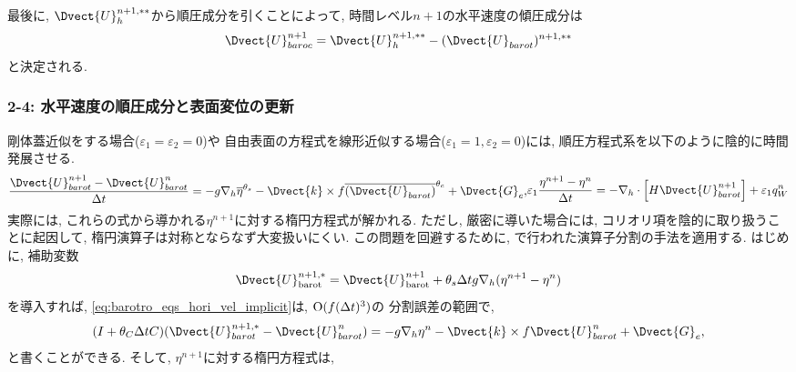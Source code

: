 最後に, $\Dvect{U}_h^{n+1,**}$から順圧成分を引くことによって, 
時間レベル$n+1$の水平速度の傾圧成分は
\begin{align*}
 \Dvect{U}_{baroc}^{n+1} 
 = \Dvect{U}_h^{n+1,**} - (\Dvect{U}_{barot})^{n+1,**}
\end{align*}
と決定される. 

\subsubsection*{2-4: 水平速度の順圧成分と表面変位の更新}
\vspace{-0.5cm}
剛体蓋近似をする場合($\varepsilon_1=\varepsilon_2=0$)や
自由表面の方程式を線形近似する場合($\varepsilon_1=1, \varepsilon_2=0$)には, 
順圧方程式系を以下のように陰的に時間発展させる. 
\begin{subequations}
\begin{align}
  \dfrac{\Dvect{U}^{n+1}_{barot} - \Dvect{U}^n_{barot}}{\Delta t}
 = 
 - g \nabla_h \overline{\eta}^{\theta_s}
 - \Dvect{k}\times f \overline{(\Dvect{U}_{barot})}^{\theta_c} 
 + \Dvect{G}_e, 
\label{eq:barotro_eqs_hori_vel_implicit}
\end{align}
\begin{align}
 \varepsilon_1 \dfrac{\eta^{n+1} - \eta^n}{\Delta t}
 = - \nabla_h \cdot \left[ H \Dvect{U}^{n+1}_{barot} \right]
   + \varepsilon_1 q_W^n
\label{eq:barotro_eqs_ssh_implicit}
\end{align}
\end{subequations}
実際には, これらの式から導かれる$\eta^{n+1}$に対する楕円方程式が解かれる.  
ただし, 厳密に導いた場合には, コリオリ項を陰的に取り扱うことに起因して, 楕円演算子は対称とならなず大変扱いにくい. 
この問題を回避するために, \cite{dukowicz1994implicit}で行われた演算子分割の手法を適用する. 
はじめに, 補助変数
\begin{equation}
 \Dvect{U}^{n+1,*}_{\rm barot} 
 = \Dvect{U}^{n+1}_{\rm barot}
   + \theta_s \Delta t g \nabla_h (\eta^{n+1} - \eta^n)
\label{eq:barot_eqs_hori_vel_optrsplit_auxvar}
\end{equation}  
を導入すれば, \eqref{eq:barotro_eqs_hori_vel_implicit}は, ${\rm O}(f(\Delta t)^3)$の
分割誤差の範囲で, 
\begin{align}
  (I + \theta_C \Delta t C) (\Dvect{U}^{n+1,*}_{barot} - \Dvect{U}^n_{barot}) 
 = 
 - g \nabla_h \eta^n
 - \Dvect{k}\times f \Dvect{U}_{barot}^n
 + \Dvect{G}_e, 
\label{eq:barotro_eqs_hori_vel_implicit_optrsplit}
\end{align}
と書くことができる. 
そして, $\eta^{n+1}$に対する楕円方程式は, 
